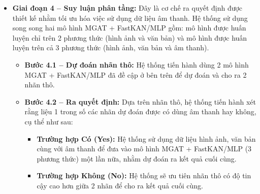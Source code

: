 \begin{itemize}[label={--}, itemsep=3pt]
    \item \textbf{Giai đoạn 4 -- Suy luận phân tầng:} Đây là cơ chế ra quyết định được thiết kế nhằm tối ưu hóa việc sử dụng dữ liệu âm thanh. Hệ thống sử dụng song song hai mô hình MGAT + FastKAN/MLP gồm: mô hình được huấn luyện chỉ trên 2 phương thức (hình ảnh và văn bản) và mô hình được huấn luyện trên cả 3 phương thức (hình ảnh, văn bản và âm thanh).
    \begin{itemize}[label={+}, itemsep=1pt]
        \item \textbf{Bước 4.1 -- Dự đoán nhãn thô:} Hệ thống tiến hành dùng 2 mô hình MGAT + FastKAN/MLP đã đề cập ở bên trên để dự đoán và cho ra 2 nhãn thô.
        
        \item \textbf{Bước 4.2 -- Ra quyết định:} Dựa trên nhãn thô, hệ thống tiến hành xét rằng liệu 1 trong số các nhãn dự đoán được có dùng âm thanh hay không, cụ thể như sau: 
        \begin{itemize}[label={\textbullet}, itemsep=1pt]
            \item \textbf{Trường hợp Có (Yes):} Hệ thống sử dụng dữ liệu hình ảnh, văn bản cùng với âm thanh để đưa vào mô hình MGAT + FastKAN/MLP (3 phương thức) một lần nữa, nhằm dự đoán ra kết quả cuối cùng.
            \item \textbf{Trường hợp Không (No):} Hệ thống sẽ ưu tiên nhãn thô có độ tin cậy cao hơn giữa 2 nhãn để cho ra kết quả cuối cùng.
        \end{itemize}
    \end{itemize}
\end{itemize}


